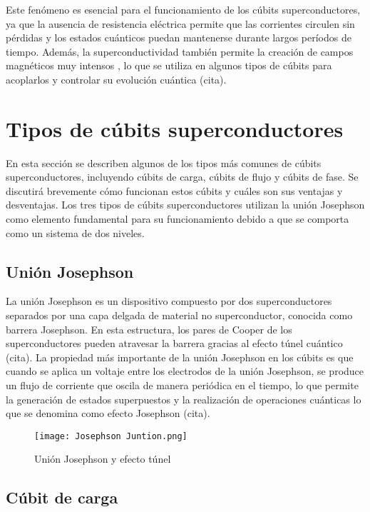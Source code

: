 \documentclass[12pt]{article}
\begin{document}
Este fenómeno es esencial para el funcionamiento de los cúbits superconductores, ya que la ausencia de resistencia eléctrica permite que las corrientes circulen sin pérdidas y los estados cuánticos puedan mantenerse durante largos períodos de tiempo. Además, la superconductividad también permite la creación de campos magnéticos muy intensos \cite{tyler_measurements_2004}, lo que se utiliza en algunos tipos de cúbits para acoplarlos y controlar su evolución cuántica (cita).

\section{Tipos de cúbits superconductores}

En esta sección se describen algunos de los tipos más comunes de cúbits superconductores, incluyendo cúbits de carga, cúbits de flujo y cúbits de fase. Se discutirá brevemente cómo funcionan estos cúbits y cuáles son sus ventajas y desventajas. Los tres tipos de cúbits superconductores utilizan la unión Josephson como elemento fundamental para su funcionamiento debido a que se comporta como un sistema de dos niveles. 
\subsection{Unión Josephson}

La unión Josephson es un dispositivo compuesto por dos superconductores separados por una capa delgada de material no superconductor, conocida como barrera Josephson. En esta estructura, los pares de Cooper de los superconductores pueden atravesar la barrera gracias al efecto túnel cuántico (cita). La propiedad más importante de la unión Josephson en los cúbits es que cuando se aplica un voltaje entre los electrodos de la unión Josephson, se produce un flujo de corriente que oscila de manera periódica en el tiempo, lo que permite la generación de estados superpuestos y la realización de operaciones cuánticas lo que se denomina como efecto Josephson (cita).  \\
\begin{figure}[h]
    \centering
    \texttt{[image: Josephson Juntion.png]}
    \caption{Unión Josephson y efecto túnel \cite{noauthor_squid_nodate}}
    \label{fig:Unión Josephsone}
  \end{figure}

\subsection{Cúbit de carga}
\end{document}
